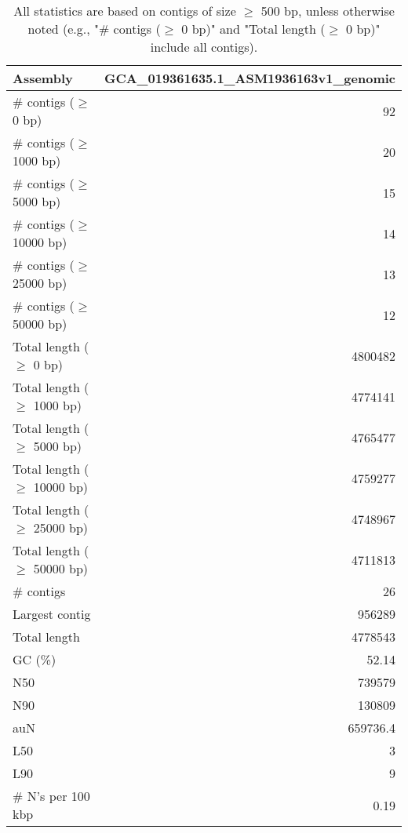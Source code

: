 \documentclass[12pt,a4paper]{article}
\begin{document}
\begin{table}[ht]
\begin{center}
\caption{All statistics are based on contigs of size $\geq$ 500 bp, unless otherwise noted (e.g., "\# contigs ($\geq$ 0 bp)" and "Total length ($\geq$ 0 bp)" include all contigs).}
\begin{tabular}{|l*{1}{|r}|}
\hline
Assembly & GCA\_019361635.1\_ASM1936163v1\_genomic \\ \hline
\# contigs ($\geq$ 0 bp) & 92 \\ \hline
\# contigs ($\geq$ 1000 bp) & 20 \\ \hline
\# contigs ($\geq$ 5000 bp) & 15 \\ \hline
\# contigs ($\geq$ 10000 bp) & 14 \\ \hline
\# contigs ($\geq$ 25000 bp) & 13 \\ \hline
\# contigs ($\geq$ 50000 bp) & 12 \\ \hline
Total length ($\geq$ 0 bp) & 4800482 \\ \hline
Total length ($\geq$ 1000 bp) & 4774141 \\ \hline
Total length ($\geq$ 5000 bp) & 4765477 \\ \hline
Total length ($\geq$ 10000 bp) & 4759277 \\ \hline
Total length ($\geq$ 25000 bp) & 4748967 \\ \hline
Total length ($\geq$ 50000 bp) & 4711813 \\ \hline
\# contigs & 26 \\ \hline
Largest contig & 956289 \\ \hline
Total length & 4778543 \\ \hline
GC (\%) & 52.14 \\ \hline
N50 & 739579 \\ \hline
N90 & 130809 \\ \hline
auN & 659736.4 \\ \hline
L50 & 3 \\ \hline
L90 & 9 \\ \hline
\# N's per 100 kbp & 0.19 \\ \hline
\end{tabular}
\end{center}
\end{table}
\end{document}
